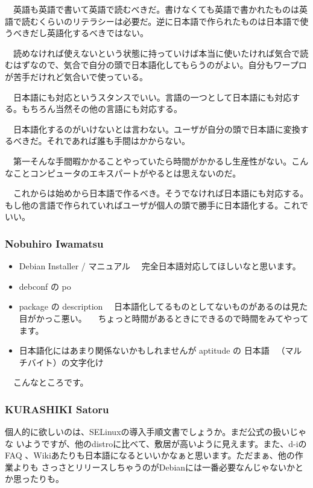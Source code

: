 \documentclass[mingoth]{jsarticle}
\begin{document}
　英語も英語で書いて英語で読むべきだ。書けなくても英語で書かれたものは英語で読むくらいのリテラシーは必要だ。逆に日本語で作られたものは日本語で使うべきだし英語化するべきではない。

　読めなければ使えないという状態に持っていけば本当に使いたければ気合で読むはずなので、気合で自分の頭で日本語化してもらうのがよい。自分もワープロが苦手だけれど気合いで使っている。

　日本語にも対応というスタンスでいい。言語の一つとして日本語にも対応する。もちろん当然その他の言語にも対応する。

　日本語化するのがいけないとは言わない。ユーザが自分の頭で日本語に変換するべきだ。それであれば誰も手間はかからない。

　第一そんな手間暇かかることやっていたら時間がかかるし生産性がない。こんなことコンピュータのエキスパートがやるとは思えないのだ。

　これからは始めから日本語で作るべき。そうでなければ日本語にも対応する。もし他の言語で作られていればユーザが個人の頭で勝手に日本語化する。これでいい。
\subsubsection{Nobuhiro Iwamatsu}

\begin{itemize}
 \item 
Debian Installer / マニュアル
　完全日本語対応してほしいなと思います。
 \item 
debconf の po
 \item 
package の description
　日本語化してるものとしてないものがあるのは見た目がかっこ悪い。
　ちょっと時間があるときにできるので時間をみてやってます。
 \item 
日本語化にはあまり関係ないかもしれませんが aptitude の 日本語
　（マルチバイト）の文字化け
\end{itemize}

　こんなところです。

\subsubsection{KURASHIKI Satoru}

個人的に欲しいのは、SELinuxの導入手順文書でしょうか。まだ公式の扱いじゃな
いようですが、他のdistroに比べて、敷居が高いように見えます。また、d-iのFAQ
、Wikiあたりも日本語になるといいかなぁと思います。ただまぁ、他の作業よりも
さっさとリリースしちゃうのがDebianには一番必要なんじゃないかとか思ったりも。
\end{document}

